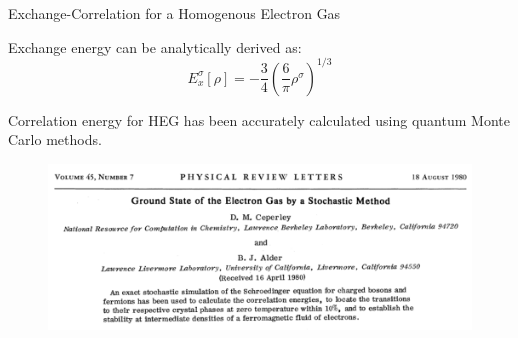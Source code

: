 \documentclass[aspectratio=169]{beamer}
\begin{document}
    \begin{frame}{Exchange-Correlation for a Homogenous Electron Gas}

        Exchange energy can be analytically derived as:
        \begin{equation*}
            E_x^\sigma[\rho] = -\frac{3}{4}\left( \frac{6}{\pi} \rho^\sigma \right)^{1/3}
        \end{equation*}

        Correlation energy for HEG has been accurately calculated using quantum Monte Carlo methods.\cite{ceperleyGroundStateElectron1980}
        \begin{figure}
            \centering
            \includegraphics[width=0.7\linewidth]{lectures/figures/5_LDA_Corre.png}
        \end{figure}
    \end{frame}
\end{document}
